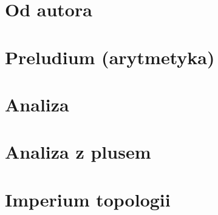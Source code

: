\tableofcontents
\newpage


\chapter*{Od autora}

\newpage

\chapter{Preludium (arytmetyka)}
	
\chapter{Analiza}

\chapter{Analiza z plusem}

\chapter{Imperium topologii}

